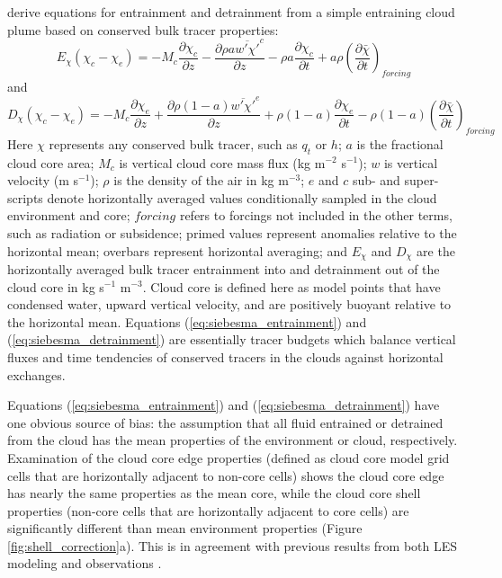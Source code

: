 \documentclass[draft,grl]{agutex}
\begin{document}
\begin{article}
\cite{Siebesma1995} derive equations for entrainment and detrainment from a 
simple entraining cloud plume based on conserved bulk tracer properties:
\begin{equation}
  \label{eq:siebesma_entrainment}
    E_{\chi}(\chi_c - \chi_e) = - M_c \frac{\partial \chi_c}{\partial z}
        - \frac{\partial \rho a \overline{w' \chi'}^c}{\partial z}
        - \rho a \frac{\partial \chi_c}{\partial t}
        + a \rho \left(\frac{\partial \bar{\chi}}{\partial t}\right)_{forcing}
\end{equation}
and
\begin{equation}
  \label{eq:siebesma_detrainment}
    D_{\chi}(\chi_c - \chi_e) = - M_c \frac{\partial \chi_e}{\partial z}
        + \frac{\partial \rho (1 - a) \overline{w' \chi'}^e}{\partial z}
        + \rho (1-a) \frac{\partial \chi_e}{\partial t}
     - \rho (1-a) \left(\frac{\partial \bar{\chi}}{\partial t}\right)_{forcing}
\end{equation}
Here $\chi$ represents any conserved bulk tracer, such as $q_t$ or $h$; $a$ is 
the fractional cloud core area; $M_c$ is vertical cloud core mass flux 
(kg m$^{-2}$ s$^{-1}$); $w$ is vertical velocity (m s$^{-1}$); $\rho$ is the 
density of the air in kg m$^{-3}$; $e$ and $c$ sub- and super-scripts denote 
horizontally averaged values conditionally sampled in the cloud environment and 
core; $forcing$ refers to forcings not included in the other terms, such as 
radiation or subsidence; primed values represent anomalies relative to the 
horizontal mean; overbars represent horizontal averaging; and $E_{\chi}$ and 
$D_{\chi}$ are the horizontally averaged bulk tracer entrainment into and 
detrainment out of the cloud core in kg s$^{-1}$ m$^{-3}$.  Cloud core is 
defined here as model points that have condensed water, upward vertical 
velocity, and are positively buoyant relative to the horizontal mean.  
Equations (\ref{eq:siebesma_entrainment}) and (\ref{eq:siebesma_detrainment}) 
are essentially tracer budgets which balance vertical fluxes and time 
tendencies of conserved tracers in the clouds against horizontal exchanges.

Equations (\ref{eq:siebesma_entrainment}) and (\ref{eq:siebesma_detrainment}) 
have one obvious source of bias: the assumption that all fluid entrained or 
detrained from the cloud has the mean properties of the environment or cloud, 
respectively.  Examination of the cloud core edge properties (defined as cloud 
core model grid cells that are horizontally adjacent to non-core cells) shows 
the cloud core edge has nearly the same properties as the mean core, while the 
cloud core shell properties (non-core cells that are horizontally adjacent to 
core cells) are significantly different than mean environment properties 
(Figure \ref{fig:shell_correction}a).  This is in agreement with previous 
results from both LES modeling and observations \citep{Heus2008}.
  

\end{article}
\end{document}

